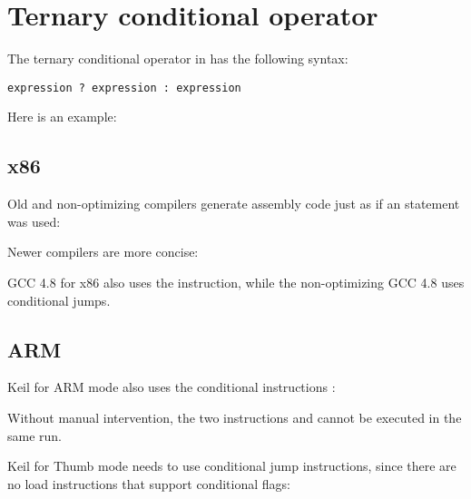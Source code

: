 \section{Ternary conditional operator}
\label{chap:cond}

The ternary conditional operator in \CCpp has the following syntax:

\begin{lstlisting}
expression ? expression : expression
\end{lstlisting}

Here is an example:



\subsection{x86}

Old and non-optimizing compilers generate assembly code just as if an  statement was used:





Newer compilers are more concise:



\Optimizing GCC 4.8 for x86 also uses the  instruction, while the non-optimizing GCC 4.8 uses conditional jumps.

\subsection{ARM}

\Optimizing Keil for ARM mode also uses the conditional instructions :



Without manual intervention, the two instructions  and  cannot be executed in the same run.

\Optimizing Keil for Thumb mode needs to use conditional jump instructions, since there are no load instructions
that support conditional flags:

